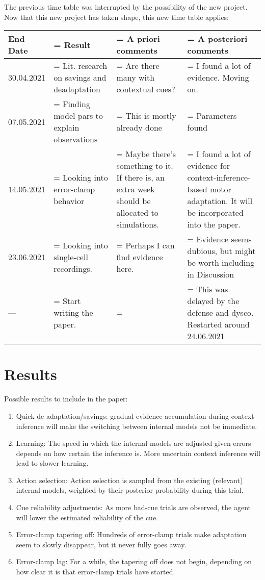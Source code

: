 \documentclass{report}
\begin{document}
The previous time table was interrupted by the possibility of the new project. Now that this new project has taken shape, this new time table applies:

\begin{tabularx}{\textwidth}{
  l|
  >{\hsize=0.4\hsize\linewidth=\hsize}X|
  >{\hsize=0.2\hsize\linewidth=\hsize}X|
  >{\hsize=0.2\hsize\linewidth=\hsize}X}
End Date & Result & A priori comments & A posteriori comments \\ \hline \hline
30.04.2021 & Lit. research on savings and deadaptation & Are there many with contextual cues? & I found a lot of evidence. Moving on.\\ \hline
07.05.2021 & Finding model pars to explain observations & This is mostly already done &  Parameters found\\\hline
14.05.2021 & Looking into error-clamp behavior & Maybe there's something to it. If there is, an extra week should be allocated to simulations. & I found a lot of evidence for context-inference-based motor adaptation. It will be incorporated into the paper. \\\hline
23.06.2021 & Looking into single-cell recordings. & Perhaps I can find evidence here. & Evidence seems dubious, but might be worth including in Discussion \\ \hline
--- & Start writing the paper. & & This was delayed by the defense and dysco. Restarted around 24.06.2021 \\ \hline

\end{tabularx}

\section{Results}
Possible results to include in the paper:
\begin{enumerate}
\item Quick de-adaptation/savings: gradual evidence accumulation during context inference will make the switching between internal models not be immediate.
\item Learning: The speed in which the internal models are adjusted given errors depends on how certain the inference is. More uncertain context inference will lead to slower learning.
\item Action selection: Action selection is sampled from the existing (relevant) internal models, weighted by their posterior probability during this trial.
\item Cue reliability adjustments: As more bad-cue trials are observed, the agent will lower the estimated reliability of the cue.
\item Error-clamp tapering off: Hundreds of error-clamp trials make adaptation seem to slowly disappear, but it never fully goes away.
\item Error-clamp lag: For a while, the tapering off does not begin, depending on how clear it is that error-clamp trials have started.
\end{enumerate}
\end{document}
